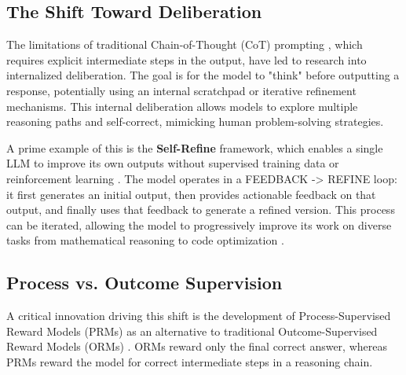 \documentclass{article}
\begin{document}
\subsection{The Shift Toward Deliberation}
The limitations of traditional Chain-of-Thought (CoT) prompting \cite{wei2022chain}, which requires explicit intermediate steps in the output, have led to research into internalized deliberation. The goal is for the model to "think" before outputting a response, potentially using an internal scratchpad or iterative refinement mechanisms. This internal deliberation allows models to explore multiple reasoning paths and self-correct, mimicking human problem-solving strategies.

A prime example of this is the \textbf{Self-Refine} framework, which enables a single LLM to improve its own outputs without supervised training data or reinforcement learning \cite{madaan2023selfrefine}. The model operates in a FEEDBACK -> REFINE loop: it first generates an initial output, then provides actionable feedback on that output, and finally uses that feedback to generate a refined version. This process can be iterated, allowing the model to progressively improve its work on diverse tasks from mathematical reasoning to code optimization \cite{madaan2023selfrefine}.

\subsection{Process vs. Outcome Supervision}
A critical innovation driving this shift is the development of Process-Supervised Reward Models (PRMs) as an alternative to traditional Outcome-Supervised Reward Models (ORMs) \cite{lightman2023lets}. ORMs reward only the final correct answer, whereas PRMs reward the model for correct intermediate steps in a reasoning chain.
\end{document}
